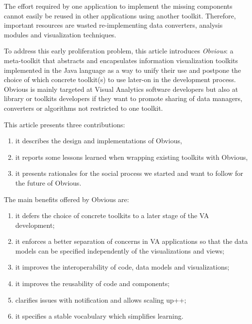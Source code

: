 The effort required by one application to implement the missing
components cannot easily be reused in other applications using another
toolkit.  Therefore, important resources are wasted re-implementing
data converters, analysis modules and visualization techniques. 

To address this early proliferation problem, this article
introduces \emph{Obvious}: a meta-toolkit that abstracts and
encapsulates information visualization toolkits implemented in the
Java language as a way to unify their use and postpone the choice of
which concrete toolkit(s) to use later-on in the development process.
Obvious is mainly targeted at Visual Analytics software developers but
also at library or toolkits developers if they want to promote sharing
of data managers, converters or algorithms not restricted to one
toolkit.

This article presents three contributions:
\begin{enumerate}[noitemsep]
\item it describes the design and implementations of Obvious,
\item it reports some lessons learned when wrapping existing toolkits
  with Obvious,
\item it presents rationales for the social process we started and
  want to follow for the future of Obvious.
\end{enumerate}

The main benefits offered by Obvious are:
\begin{enumerate}[noitemsep]
\item it defers the choice of concrete toolkits to a later stage of the
  VA development;
\item it enforces a better separation of concerns in VA applications so
  that the data models can be specified independently of the
  visualizations and views;
\item it improves the interoperability of code, data models and
  visualizations;
\item it improves the reusability of code and components;
\item clarifies issues with notification and allows scaling up++;
\item it specifies a stable vocabulary which simplifies learning.
\end{enumerate}

